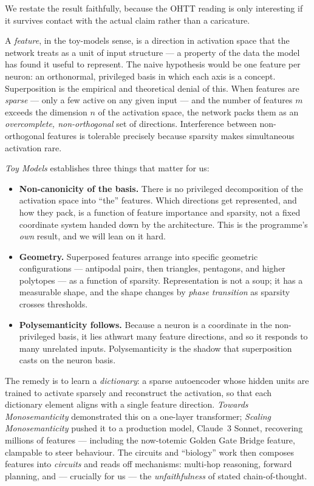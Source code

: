 \documentclass[11pt,a4paper]{article}
\begin{document}
We restate the result faithfully, because the OHTT reading is only interesting if it survives
contact with the actual claim rather than a caricature.

A \emph{feature}, in the toy-models sense, is a direction in activation space that the network
treats as a unit of input structure --- a property of the data the model has found it useful to
represent. The naive hypothesis would be one feature per neuron: an orthonormal, privileged
basis in which each axis is a concept. Superposition is the empirical and theoretical denial of
this. When features are \emph{sparse} --- only a few active on any given input --- and the
number of features $m$ exceeds the dimension $n$ of the activation space, the network packs them
as an \emph{overcomplete, non-orthogonal} set of directions. Interference between non-orthogonal
features is tolerable precisely because sparsity makes simultaneous activation rare.

\emph{Toy Models} \cite{toymodels} establishes three things that matter for us:

\begin{itemize}
  \item \textbf{Non-canonicity of the basis.} There is no privileged decomposition of the
  activation space into ``the'' features. Which directions get represented, and how they pack,
  is a function of feature importance and sparsity, not a fixed coordinate system handed down by
  the architecture. This is the programme's \emph{own} result, and we will lean on it hard.
  \item \textbf{Geometry.} Superposed features arrange into specific geometric configurations ---
  antipodal pairs, then triangles, pentagons, and higher polytopes --- as a function of
  sparsity. Representation is not a soup; it has a measurable shape, and the shape changes by
  \emph{phase transition} as sparsity crosses thresholds.
  \item \textbf{Polysemanticity follows.} Because a neuron is a coordinate in the non-privileged
  basis, it lies athwart many feature directions, and so it responds to many unrelated inputs.
  Polysemanticity is the shadow that superposition casts on the neuron basis.
\end{itemize}

The remedy is to learn a \emph{dictionary}: a sparse autoencoder whose hidden units are trained
to activate sparsely and reconstruct the activation, so that each dictionary element aligns with
a single feature direction. \emph{Towards Monosemanticity} \cite{towards} demonstrated this on a
one-layer transformer; \emph{Scaling Monosemanticity} \cite{scaling} pushed it to a production
model, Claude~3 Sonnet, recovering millions of features --- including the now-totemic Golden
Gate Bridge feature, clampable to steer behaviour. The circuits and ``biology'' work
\cite{biology, mathframework, induction} then composes features into \emph{circuits} and reads
off mechanisms: multi-hop reasoning, forward planning, and --- crucially for us --- the
\emph{unfaithfulness} of stated chain-of-thought.
\end{document}
